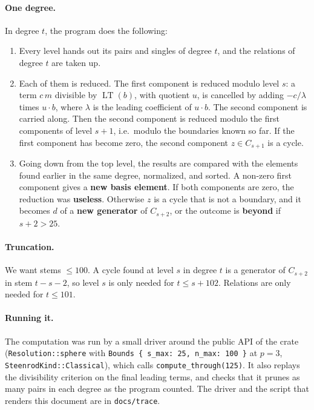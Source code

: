\documentclass[11pt]{article}
\DeclareMathOperator{\LT}{LT}
\begin{document}
\paragraph{One degree.}
In degree $t$, the program does the following:
\begin{enumerate}
\item Every level hands out its pairs and singles of degree $t$, and the relations of degree
  $t$ are taken up.
\item Each of them is reduced. The first component is reduced modulo level $s$: a term
  $c\,m$ divisible by $\LT(b)$, with quotient $u$, is cancelled by adding $-c/\lambda$ times
  $u \cdot b$, where $\lambda$ is the leading coefficient of $u \cdot b$. The second component
  is carried along. Then the second component is reduced modulo the first components of level
  $s+1$, i.e.\ modulo the boundaries known so far. If the first component has become zero, the
  second component $z \in C_{s+1}$ is a cycle.
\item Going down from the top level, the results are compared with the elements found earlier
  in the same degree, normalized, and sorted. A non-zero first component gives a \textbf{new
  basis element}. If both components are zero, the reduction was \textbf{useless}. Otherwise
  $z$ is a cycle that is not a boundary, and it becomes $d$ of a \textbf{new generator} of
  $C_{s+2}$, or the outcome is \textbf{beyond} if $s + 2 > 25$.
\end{enumerate}

\paragraph{Truncation.}
We want stems $\le 100$. A cycle found at level $s$ in degree $t$ is a generator of $C_{s+2}$ in
stem $t-s-2$, so level $s$ is only needed for $t \le s + 102$. Relations are only needed for
$t \le 101$.

\paragraph{Running it.}\sloppy
The computation was run by a small driver around the public API of the crate (\texttt{Resolution::sphere} with \texttt{Bounds \{ s\_max: 25, n\_max: 100 \}} at $p = 3$, \texttt{SteenrodKind::Classical}), which calls \texttt{compute\_through(125)}. It also replays the divisibility criterion on the final leading terms, and checks that it prunes as many pairs in each degree as the program counted. The driver and the script that renders this document are in \texttt{docs/trace}.
\end{document}
